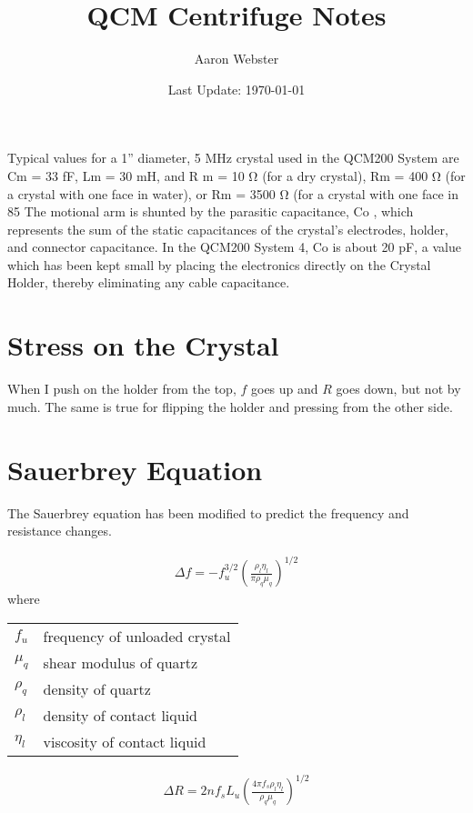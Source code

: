 \documentclass[a4paper]{article}
\begin{document}
\title{QCM Centrifuge Notes}
\author{Aaron Webster}
\date{Last Update: \today}
\maketitle
\tableofcontents
\newpage

Typical values for a 1” diameter, 5 MHz crystal used in the QCM200 System are
Cm = 33 fF, Lm = 30 mH, and R m = 10 Ω (for a dry crystal), Rm = 400 Ω (for a crystal
with one face in water), or Rm = 3500 Ω (for a crystal with one face in 85%
The motional arm is shunted by the parasitic capacitance, Co , which represents the sum
of the static capacitances of the crystal’s electrodes, holder, and connector capacitance. In
the QCM200 System 4, Co is about 20 pF, a value which has been kept small by placing
the electronics directly on the Crystal Holder, thereby eliminating any cable capacitance.


\section{Stress on the Crystal}
\cite{filler1988acceleration}


When I push on the holder from the top, $f$ goes up and $R$ goes down, but
not by much.  The same is true for flipping the holder and pressing from
the other side.

\section{Sauerbrey Equation}
The Sauerbrey equation has been modified to predict the frequency and
resistance changes.

\begin{align}
  \Delta f = -f_u^{3/2} \left(\frac{\rho_l \eta_l}{\pi \rho_q \mu_q}\right)^{1/2}
\end{align}
where

\begin{tabular}{ll}
  $f_u$    & frequency of unloaded crystal \\
  $\mu_q$  & shear modulus of quartz       \\
  $\rho_q$ & density of quartz             \\
  $\rho_l$ & density of contact liquid     \\
  $\eta_l$ & viscosity of contact liquid
\end{tabular}

\begin{align}
  \Delta R = 2 n f_s L_u \left(\frac{4 \pi f_s \rho_l \eta_l}{\rho_q \mu_q}\right)^{1/2}
\end{align}
\end{document}
